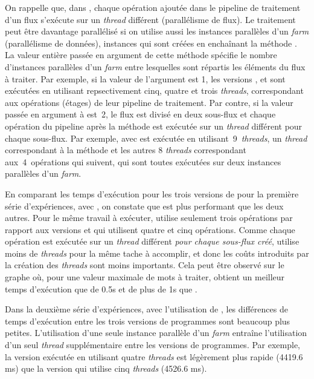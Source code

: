 On rappelle que, dans , chaque op\'eration ajout\'ee dans le pipeline de traitement d'un flux s'ex\'ecute sur un \emph{thread} diff\'erent (parallélisme de flux). Le traitement peut \^etre davantage parall\'elis\'e si on utilise aussi les instances parall\`eles d'un \emph{farm} (parallélisme de données), instances qui sont cr\'e\'ees en encha\^inant la m\'ethode . La valeur enti\`ere pass\'ee en argument de cette m\'ethode sp\'ecifie le nombre d'instances parall\`eles d'un \emph{farm} entre lesquelles sont r\'epartis les \'el\'ements du flux \`a traiter. Par exemple, si la valeur de l'argument est 1, les versions ,  et  sont ex\'ecut\'ees en utilisant repsectivement cinq, quatre et trois \emph{threads}, correspondant aux op\'erations (étages) de leur pipeline de traitement. Par contre, si la valeur pass\'ee en argument \`a   est~2, le flux est divis\'e en deux sous-flux et chaque op\'eration du pipeline après la m\'ethode  est ex\'ecut\'ee sur un \emph{thread} diff\'erent pour chaque sous-flux. Par exemple,  avec  est ex\'ecut\'ee en utilisant~9~\emph{threads}, un \emph{thread} correspondant \`a la m\'ethode  et les autres 8 \emph{threads} correspondant aux~4~op\'erations qui suivent, qui sont toutes ex\'ecut\'ees sur deux instances parall\`eles d'un \emph{farm}.

En comparant les temps d'ex\'ecution pour les trois versions de  pour la premi\`ere s\'erie d'exp\'eriences, avec , on constate que  est plus performant que les deux autres. Pour le m\^eme travail \`a ex\'ecuter,  utilise seulement trois op\'erations par rapport aux versions  et  qui utilisent quatre et cinq opérations. Comme chaque op\'eration est ex\'ecut\'ee sur un \emph{thread} diff\'erent \emph{pour chaque sous-flux cr\'e\'e},  utilise moins de \emph{threads} pour la m\^eme tache \`a accomplir, et donc les co\^uts introduits par la cr\'eation des \emph{threads} sont moins importants. Cela peut \^etre observ\'e sur le graphe o\`u, pour une valeur maximale de mots \`a traiter,  obtient un meilleur temps d'ex\'ecution que  de 0.5s et de plus de 1s que . 

Dans la deuxi\`eme s\'erie d'exp\'eriences, avec l'utilisation de , les diff\'erences de temps d'ex\'ecution entre les trois versions de programmes sont beaucoup plus petites. L'utilisation d'une seule instance parall\`ele d'un \emph{farm} entra\^ine l'utilisation d'un seul \emph{thread} suppl\'ementaire entre les versions de programmes. Par exemple, la version  ex\'ecut\'ee en utilisant quatre \emph{threads} est légèrement plus rapide (4419.6 ms) que la version  qui utilise cinq \emph{threads} (4526.6 ms). 

